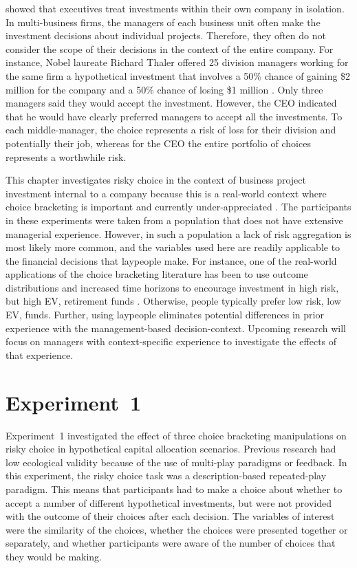 \documentclass[a4paper, nobind]{templates/ociamthesis}
\theoremstyle{definition}
\theoremstyle{definition}
\theoremstyle{definition}
\theoremstyle{definition}
\theoremstyle{remark}
\begin{document}
\textcite{lovallo2020} showed that executives treat investments within their own company
in isolation. In multi-business firms, the managers of each business unit often
make the investment decisions about individual projects. Therefore, they often
do not consider the scope of their decisions in the context of the entire
company. For instance, Nobel laureate Richard Thaler offered 25 division
managers working for the same firm a hypothetical investment that involves a 50\%
chance of gaining \$2 million for the company and a 50\% chance of losing \$1
million \autocite*{thaler1999}. Only three managers said they would accept the
investment. However, the CEO indicated that he would have clearly preferred
managers to accept all the investments. To each middle-manager, the choice
represents a risk of loss for their division and potentially their job, whereas
for the CEO the entire portfolio of choices represents a worthwhile risk.

This chapter investigates risky choice in the context of business project
investment internal to a company because this is a real-world context where
choice bracketing is important and currently under-appreciated \autocite{lovallo2020}.
The participants in these experiments were taken from a population that does not
have extensive managerial experience. However, in such a population a lack of
risk aggregation is most likely more common, and the variables used here are
readily applicable to the financial decisions that laypeople make. For instance,
one of the real-world applications of the choice bracketing literature has been
to use outcome distributions and increased time horizons to encourage investment
in high risk, but high EV, retirement funds \autocite[e.g.,][]{benartzi1999}. Otherwise,
people typically prefer low risk, low EV, funds. Further, using laypeople
eliminates potential differences in prior experience with the management-based
decision-context. Upcoming research will focus on managers with context-specific
experience to investigate the effects of that experience.

\hypertarget{aggregation-1}{%
\section{Experiment~1}\label{aggregation-1}}

Experiment~1 investigated the effect of three choice bracketing manipulations on
risky choice in hypothetical capital allocation scenarios. Previous research
had low ecological validity because of the use of multi-play paradigms or
feedback. In this experiment, the risky choice task was a description-based
repeated-play paradigm. This means that participants had to make a choice about
whether to accept a number of different hypothetical investments, but were not
provided with the outcome of their choices after each decision. The variables of
interest were the similarity of the choices, whether the choices were presented
together or separately, and whether participants were aware of the number of
choices that they would be making.
\end{document}
